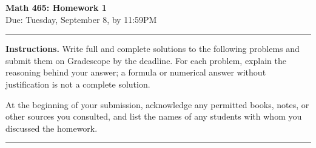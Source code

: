 \documentclass[11pt]{article}
\newcommand{\duedate}{Tuesday, September 8, by 11:59PM}
\begin{document}
\begin{center}
    {\Large\bfseries Math 465: Homework 1}\\[4pt]
    {\large Due: \duedate}
\end{center}

\hrule
\vspace{0.8em}

\textbf{Instructions.}
Write full and complete solutions to the following problems and submit them on Gradescope by the deadline. For each problem, explain the reasoning behind your answer; a formula or numerical answer without justification is not a complete solution.

At the beginning of your submission, acknowledge any permitted books, notes, or other sources you consulted, and list the names of any students with whom you discussed the homework.

\vspace{0.5em}
\hrule
\vspace{1em}
\end{document}
